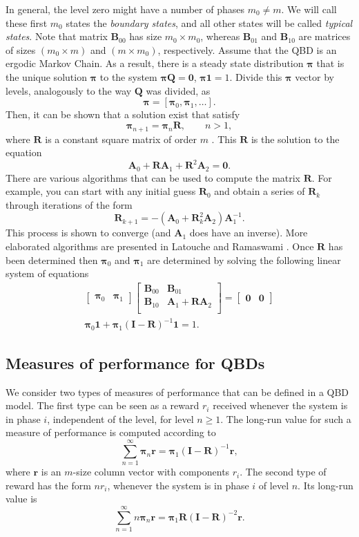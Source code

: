 \documentclass[11pt,letterpaper]{article}
\newcommand{\bA}{{\mathbf A}}
\newcommand{\bB}{{\mathbf B}}
\newcommand{\bQ}{{\mathbf Q}}
\newcommand{\bR}{{\mathbf R}}
\newcommand{\one}{{\mathbf 1}}
\newcommand{\zero}{{\mathbf 0}}
\newcommand{\bpi}{{\boldsymbol{\pi}}}
\newcommand{\bI}{{\mathbf I}}
\newcommand{\br}{\mathbf{r}}
\begin{document}
In general, the level zero might have  a number of phases $m_0\neq m$. We will call these first $m_0$ states the \textit{boundary states}, and all other states will be called \textit{typical states}. Note that matrix $\bB_{00}$ has size $m_0\times m_0$, whereas $\bB_{01}$ and $\bB_{10}$ are matrices of sizes $(m_0\times m)$ and $(m \times m_0)$, respectively. Assume that the QBD is an ergodic Markov Chain. As a result, there is a steady state distribution $\bpi$ that is the
unique solution $\bpi$ to the system $\bpi \bQ = \zero$,
$\bpi \one = 1$.
Divide this $\bpi$ vector by levels, analogously to the way $\bQ$ was divided, as
\[ \bpi = [ \bpi_0, \bpi_1,\ldots]. \]
Then, it can be shown that a solution exist that satisfy
\[  \bpi_{n+1}= \bpi_n\bR, \qquad n > 1,\]
where $\bR$ is a constant square matrix of order $m$ \cite{neut81}.
This $\bR$ is the solution to the equation
\[ \bA_0 + \bR\bA_1  + \bR^2\bA_2  = \zero. \]
There are various algorithms that can be used to compute the matrix $\bR$. For example, you can start with any initial guess $\bR_0$ and obtain a series of $\bR_k$ through iterations of the form
\[ \bR_{k+1} = -(\bA_0 + \bR^2_k\bA_2 )\bA_1^{-1}. \]
This process is shown to converge (and $\bA_1$ does have an
inverse). More elaborated algorithms are presented in  Latouche
and Ramaswami \cite{lato.rama99}. Once $\bR$ has been determined
then $\bpi_0$ and $\bpi_1$ are determined by solving the following
linear system of equations
\begin{gather*}
        \begin{bmatrix}
            \bpi_0 & \bpi_1
        \end{bmatrix}
        \begin{bmatrix}
        \bB_{00} & \bB_{01}\\
        \bB_{10} & \bA_1 + \bR\bA_2\\
        \end{bmatrix}
         =
        \begin{bmatrix}
            \zero  & \zero
        \end{bmatrix}
\\
         \bpi_0 \one + \bpi_1(\bI-\bR)^{-1}\one = 1.
\end{gather*}

\subsection{Measures of performance for QBDs}
We consider two types of measures of performance that can be defined in a QBD model. The first type can be seen as a reward $r_i$ received whenever the system is in phase $i$, independent of the level, for level $n\ge1$. The long-run value for such a measure of performance is computed according to
\[ \sum_{n=1}^\infty \bpi_n \br = \bpi_1(\bI-\bR)^{-1}\br, \]
where $\br$ is an $m$-size column vector with components $r_i$. The second type of reward has the form $nr_i$, whenever the system is in phase $i$ of level $n$. Its long-run value is
\[\sum_{n=1}^\infty n \bpi_n \br = \bpi_1\bR(\bI-\bR)^{-2}\br. \]
\addtolength{\textheight}{-0cm}
\end{document}
